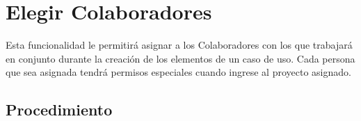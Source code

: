 \hypertarget{cv:elegirColaboradores}{\section{Elegir Colaboradores}} \label{sec:elegirColaboradores}

	Esta funcionalidad le permitirá asignar a los Colaboradores con los que trabajará en conjunto durante la creación de los elementos de un caso de uso. Cada persona que sea asignada tendrá permisos especiales cuando ingrese al proyecto asignado.

		\subsection{Procedimiento}

